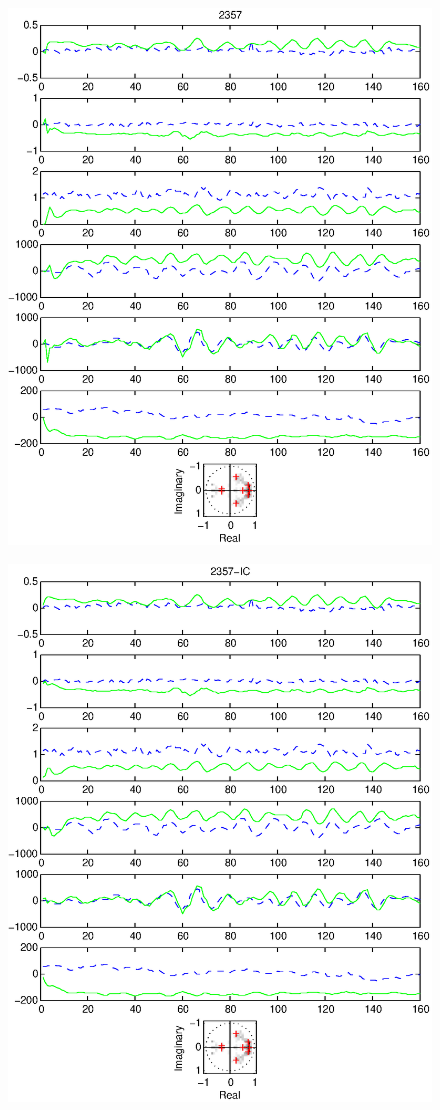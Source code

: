 \documentclass{article}
\begin{document}
\begin{figure}[htb!]\centering
\includegraphics{2357.eps}
\end{figure}\clearpage
\begin{figure}[htb!]\centering
\includegraphics{2357_ic.eps}
\end{figure}\clearpage
\end{document}
